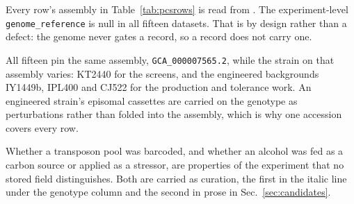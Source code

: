  Every row's assembly in
Table~\ref{tab:pcsrows} is read from . The
experiment-level \texttt{genome\_reference} is null in all fifteen datasets. That is by
design rather than a defect: the genome never gates a record, so a record does not
carry one.

All fifteen pin the same assembly, \texttt{GCA\_000007565.2}, while the strain on that
assembly varies: KT2440 for the screens, and the engineered backgrounds IY1449b,
IPL400 and CJ522 for the production and tolerance work. An engineered strain's
episomal cassettes are carried on the genotype as perturbations rather than folded
into the assembly, which is why one accession covers every row.

 Whether a transposon pool was barcoded, and
whether an alcohol was fed as a carbon source or applied as a stressor, are properties
of the experiment that no stored field distinguishes. Both are carried as curation, the
first in the italic line under the genotype column and the second in prose in
Sec.~\ref{sec:candidates}.

